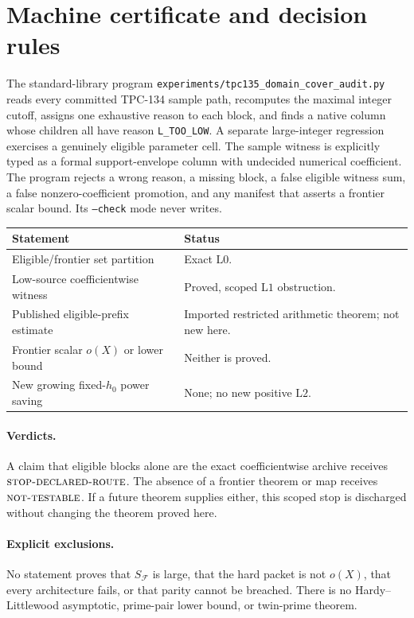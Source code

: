\documentclass[11pt]{article}
\theoremstyle{definition}
\theoremstyle{remark}
\newcommand{\F}{\mathcal F}
\newcommand{\Lzero}{\mathrm{L0}}
\newcommand{\Lone}{\mathrm{L1}}
\newcommand{\Ltwo}{\mathrm{L2}}
\newcommand{\STOP}{\textsc{stop-declared-route}}
\newcommand{\NT}{\textsc{not-testable}}
\begin{document}
\section{Machine certificate and decision rules}

The standard-library program
\texttt{experiments/tpc135\_domain\_cover\_audit.py} reads every
committed TPC-134 sample path, recomputes the maximal integer cutoff,
assigns one exhaustive reason to each block, and finds a native column
whose children all have reason \texttt{L\_TOO\_LOW}.  A separate
large-integer regression exercises a genuinely eligible parameter
cell.  The sample witness is explicitly typed as a formal
support-envelope column with undecided numerical coefficient.  The
program rejects a wrong reason, a missing block, a false eligible
witness sum, a false nonzero-coefficient promotion, and any manifest
that asserts a frontier scalar bound.  Its \texttt{--check} mode never
writes.

\begin{center}
\small
\begin{tabularx}{\textwidth}{@{}P{0.43\textwidth}Y@{}}
\toprule
Statement & Status\\
\midrule
Eligible/frontier set partition
& Exact \(\Lzero\).\\
Low-source coefficientwise witness
& Proved, scoped \(\Lone\) obstruction.\\
Published eligible-prefix estimate
& Imported restricted arithmetic theorem; not new here.\\
Frontier scalar \(o(X)\) or lower bound
& Neither is proved.\\
New growing fixed-\(h_0\) power saving
& None; no new positive \(\Ltwo\).\\
\bottomrule
\end{tabularx}
\end{center}

\paragraph{Verdicts.}
A claim that eligible blocks alone are the exact coefficientwise
archive receives \(\STOP\).  The absence of a frontier theorem or
map receives \(\NT\).  If a future theorem supplies either, this
scoped stop is discharged without changing the theorem proved here.

\paragraph{Explicit exclusions.}
No statement proves that \(S_{\F}\) is large, that the hard packet is
not \(o(X)\), that every architecture fails, or that parity cannot be
breached.  There is no Hardy--Littlewood asymptotic, prime-pair lower
bound, or twin-prime theorem.

\begingroup
\small
\setlength{\bibsep}{2pt plus 0.3ex}


\endgroup
\end{document}
